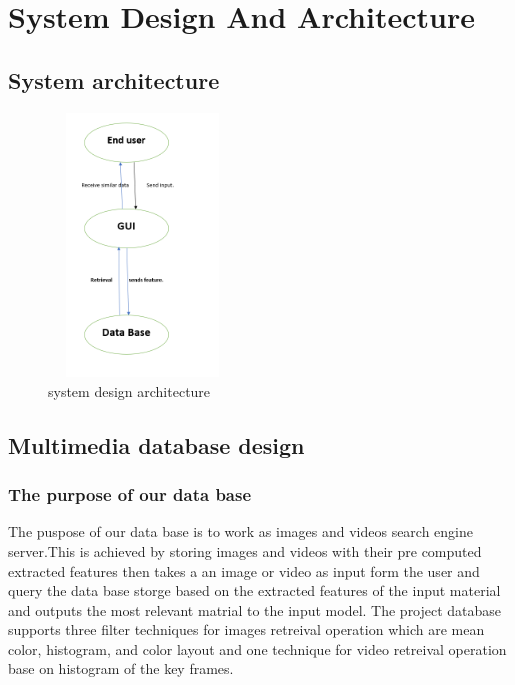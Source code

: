\chapter{System Design And Architecture}
\section{System architecture}
\begin{figure}[H]
    \centering
    \includegraphics[width=50mm,height=70mm]{Images/design.png}
    \caption{system design architecture}
  \end{figure}


\section{Multimedia database design}
\subsection{The purpose of our data base}
The puspose of our data base is to work as images and videos search engine server.This is achieved by storing images and videos with 
their pre computed extracted features then takes a an image or video as input form the user and query the data base storge based on 
the extracted features of the input material and outputs the most relevant matrial to the input model.
\vskip 0.2in
The project database supports three filter techniques for images retreival operation which are mean color, histogram, and color layout and 
one technique for video retreival operation base on histogram of the key frames.

